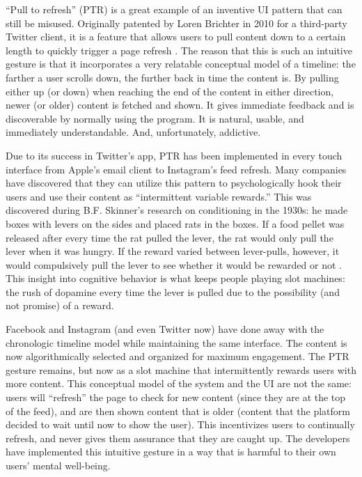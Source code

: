 \documentclass[12pt, oneside]{article}
\begin{document}
``Pull to refresh'' (PTR) is a great example of an inventive UI pattern that can still be misused. Originally patented by Loren Brichter in 2010 for a third-party Twitter client, it is a feature that allows users to pull content down to a certain length to quickly trigger a page refresh \cite{office_2010}. The reason that this is such an intuitive gesture is that it incorporates a very relatable conceptual model of a timeline: the farther a user scrolls down, the further back in time the content is. By pulling either up (or down) when reaching the end of the content in either direction, newer (or older) content is fetched and shown. It gives immediate feedback and is discoverable by normally using the program. It is natural, usable, and immediately understandable. And, unfortunately, addictive.

Due to its success in Twitter's app, PTR has been implemented in every touch interface from Apple's email client to Instagram's feed refresh. Many companies have discovered that they can utilize this pattern to psychologically hook their users and use their content as ``intermittent variable rewards.'' This was discovered during B.F. Skinner's research on conditioning in the 1930s: he made boxes with levers on the sides and placed rats in the boxes. If a food pellet was released after every time the rat pulled the lever, the rat would only pull the lever when it was hungry. If the reward varied between lever-pulls, however, it would compulsively pull the lever to see whether it would be rewarded or not \cite{leslie_2016}. This insight into cognitive behavior is what keeps people playing slot machines: the rush of dopamine every time the lever is pulled due to the possibility (and not promise) of a reward.

Facebook and Instagram (and even Twitter now) have done away with the chronologic timeline model while maintaining the same interface. The content is now algorithmically selected and organized for maximum engagement. The PTR gesture remains, but now as a slot machine that intermittently rewards users with more content. This conceptual model of the system and the UI are not the same: users will ``refresh'' the page to check for new content (since they are at the top of the feed), and are then shown content that is older (content that the platform decided to wait until now to show the user). This incentivizes users to continually refresh, and never gives them assurance that they are caught up. The developers have implemented this intuitive gesture in a way that is harmful to their own users' mental well-being.
\end{document}
